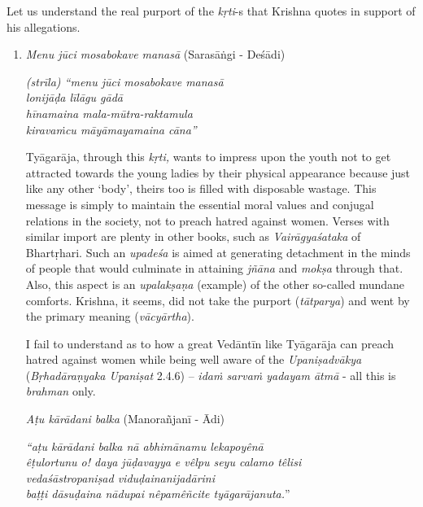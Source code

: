 Let us understand the real purport of the \textit{kṛti}-s that Krishna quotes in support of his allegations.

\begin{enumerate}
\itemsep=0pt

 \item 
 \textit{Menu jūci mosabokave manasā} (Sarasāṅgi - Deśādi)

\begin{longquote}
\textit{(strīla) “menu jūci mosabokave manasā}\\ \textit{lonijāḍa līlāgu gādā}\\ \textit{hīnamaina mala-mūtra-raktamula}\\ \textit{kiravaṁcu māyāmayamaina cāna”}
\end{longquote}

 Tyāgarāja, through this \textit{kṛti,} wants to impress upon the youth not to get attracted towards the young ladies by their physical appearance because just like any other ‘body’, theirs too is filled with disposable wastage. This message is simply to maintain the essential moral values and conjugal relations in the society, not to preach hatred against women. Verses with similar import are plenty in other books, such as \textit{Vairāgyaśataka} of Bhartṛhari. Such an \textit{upadeśa} is aimed at generating detachment in the minds of people that would culminate in attaining \textit{jñāna} and \textit{mokṣa} through that. Also, this aspect is an \textit{upalakṣaṇa} (example) of the other so-called mundane comforts. Krishna, it seems, did not take the purport (\textit{tātparya}) and went by the primary meaning (\textit{vācyārtha}).

 I fail to understand as to how a great Vedāntīn like Tyāgarāja can preach hatred against women while being well aware of the \textit{Upaniṣadvākya} (\textit{Bṛhadāraṇyaka Upaniṣat} 2.4.6) – \textit{idaṁ sarvaṁ yadayam ātmā} - all this is \textit{brahman} only.

 \textit{Aṭu kārādani balka} (Manorañjanī - Ādi)

\begin{longquote}
\textit{“aṭu kārādani balka nā abhimānamu lekapoyênā} \\ \textit{êṭulortunu o! daya jūḍavayya e vêlpu seyu calamo têlisi}\\ \textit{vedaśāstropaniṣad viduḍainanijadārini} \\ \textit{baṭṭi dāsuḍaina nādupai nêpamêñcite tyāgarājanuta.}”
\end{longquote}


\end{enumerate}
